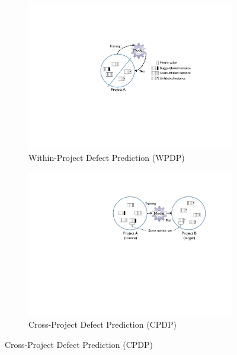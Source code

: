 \begin{figure}[t]

	\centering
 
 \begin{subfigure}[b]{0.8\linewidth}
 	\includegraphics[scale=0.5]{Figures/intro/p_within.pdf}
  	\caption{Within-Project Defect Prediction \tiny{(WPDP)}}
   	\label{fig:subfig1}
 \end{subfigure}
 
 \begin{subfigure}{0.8\linewidth}
 	\includegraphics[scale=0.5]{Figures/intro/p_cross.pdf}
  	\caption{Cross-Project Defect Prediction \tiny{(CPDP)}}
   	\label{fig:subfig2}
 \end{subfigure}
 

\end{figure}
